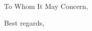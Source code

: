 \documentclass[english]{kthletter}
\date{Stockholm, \today}
\begin{document}
\begin{letter}%
  {}
\opening{To Whom It May Concern,}

\closing{Best regards,}



\end{letter}
\end{document}
